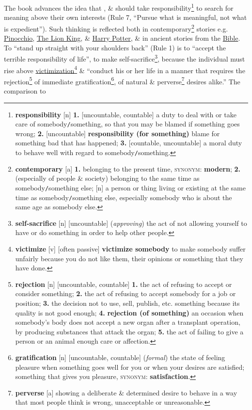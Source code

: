\documentclass{article}
\begin{document}
The book advances the idea that , \& should take responsibility\footnote{\textbf{responsibility} [n] \textbf{1.} [uncountable, countable] a duty to deal with or take care of somebody{\tt/}something, so that you may be blamed if something goes wrong; \textbf{2.} [uncountable] \textbf{responsibility (for something)} blame for something bad that has happened; \textbf{3.} [countable, uncountable] a moral duty to behave well with regard to somebody{\tt/}something.} to search for meaning above their own interests (Rule 7, ``Pursue what is meaningful, not what is expedient''). Such thinking is reflected both in contemporary\footnote{\textbf{contemporary} [a] \textbf{1.} belonging to the present time, \textsc{synonym}: \textbf{modern}; \textbf{2.} (especially of people \& society) belonging to the same time as somebody{\tt/}something else; [n] a person or thing living or existing at the same time as somebody{\tt/}something else, especially somebody who is about the same age as somebody else.} stories e.g. \href{https://en.wikipedia.org/wiki/Pinocchio_(1940_film)}{Pinocchio}, \href{https://en.wikipedia.org/wiki/The_Lion_King}{The Lion King}, \& \href{https://en.wikipedia.org/wiki/Harry_Potter}{Harry Potter}, \& in ancient stories from the \href{https://en.wikipedia.org/wiki/Bible}{Bible}. To ``stand up straight with your shoulders back'' (Rule 1) is to ``accept the terrible responsibility of life'', to make self-sacrifice\footnote{\textbf{self-sacrifice} [n] [uncountable] (\textit{approving}) the act of not allowing yourself to have or do something in order to help other people.}, because the individual must rise above \href{https://en.wikipedia.org/wiki/Victimisation}{victimization}\footnote{\textbf{victimize} [v] [often passive] \textbf{victimize somebody} to make somebody suffer unfairly because you do not like them, their opinions or something that they have done.} \& ``conduct his or her life in a manner that requires the rejection\footnote{\textbf{rejection} [n] [uncountable, countable] \textbf{1.} the act of refusing to accept or consider something; \textbf{2.} the act of refusing to accept somebody for a job or position; \textbf{3.} the decision not to use, sell, publish, etc. something because its quality is not good enough; \textbf{4.} \textbf{rejection (of something)} an occasion when somebody's body does not accept a new organ after a transplant operation, by producing substances that attack the organ; \textbf{5.} the act of failing to give a person or an animal enough care or affection.} of immediate gratification\footnote{\textbf{gratification} [n] [uncountable, countable] (\textit{formal}) the state of feeling pleasure when something goes well for you or when your desires are satisfied; something that gives you pleasure, \textsc{synonym}: \textbf{satisfaction}.}, of natural \& perverse\footnote{\textbf{perverse} [a] showing a deliberate \& determined desire to behave in a way that most people think is wrong, unacceptable or unreasonable.} desires alike.'' The comparison to 
\end{document}
